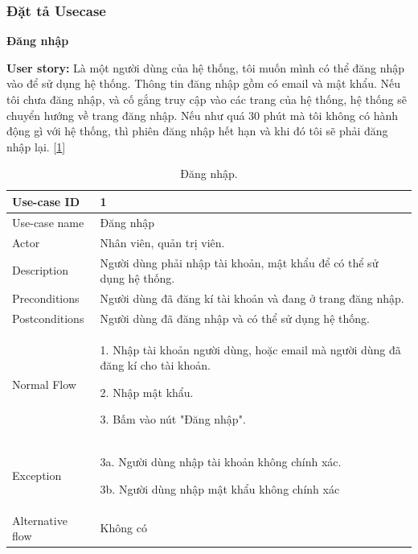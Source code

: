 \subsubsection{Đặt tả Usecase}
\textbf{Đăng nhập}\par
\textbf{User story:} Là một người dùng của hệ thống, tôi muốn mình có thể đăng nhập vào để sử dụng hệ thống. Thông tin đăng nhập gồm có email và mật khẩu. Nếu tôi chưa đăng nhập, và cố gắng truy cập vào các trang của hệ thống, hệ thống sẽ chuyển hướng về trang đăng nhập. Nếu như quá 30 phút mà tôi không có hành động gì với hệ thống, thì phiên đăng nhập hết hạn và khi đó tôi sẽ phải đăng nhập lại. [\ref{bang1}]
\begin{table}[!htp]
    \centering
    \begin{tabular}{|m{3cm}|m{10cm}|}
    \hline 
        Use-case ID & 1\\ \hline
        Use-case name & Đăng nhập\\ \hline
        Actor & Nhân viên, quản trị viên.\\ \hline
        Description & Người dùng phải nhập tài khoản, mật khẩu để có thể sử dụng hệ thống.\\ \hline
        Preconditions & Người dùng đã đăng kí tài khoản và đang ở trang đăng nhập.\\ \hline
        Postconditions & Người dùng đã đăng nhập và có thể sử dụng hệ thống.\\ \hline
        Normal Flow & 
        1. Nhập tài khoản người dùng, hoặc email mà người dùng đã đăng kí cho tài khoản.\par
        2. Nhập mật khẩu.\par
        3. Bấm vào nút "Đăng nhập".
        \\ \hline
        Exception & 
        3a. Người dùng nhập tài khoản không chính xác.\par
        3b. Người dùng nhập mật khẩu không chính xác
        \\ \hline
        Alternative flow & Không có\\ 
    \hline 
    \end{tabular}
    \caption{Đăng nhập.}
    \label{bang1}
\end{table}

